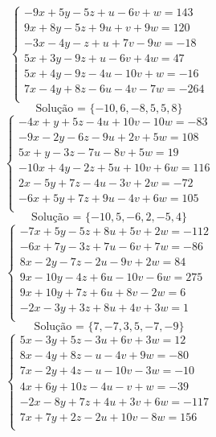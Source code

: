 \documentclass[12pt,oneside,a4paper]{article}
\begin{document}
\vspace{\baselineskip}
\begin{equation*}
\begin{cases}
-9x+5y-5z+u-6v+w=143 \\
9x+8y-5z+9u+v+9w=120 \\
-3x-4y-z+u+7v-9w=-18 \\
5x+3y-9z+u-6v+4w=47 \\
5x+4y-9z-4u-10v+w=-16 \\
7x-4y+8z-6u-4v-7w=-264 \\
\end{cases}
\end{equation*}
\begin{equation*}
\text{Solução = }\{-10,6,-8,5,5,8\}
\end{equation*}
\vspace{\baselineskip}
\begin{equation*}
\begin{cases}
-4x+y+5z-4u+10v-10w=-83 \\
-9x-2y-6z-9u+2v+5w=108 \\
5x+y-3z-7u-8v+5w=19 \\
-10x+4y-2z+5u+10v+6w=116 \\
2x-5y+7z-4u-3v+2w=-72 \\
-6x+5y+7z+9u-4v+6w=105 \\
\end{cases}
\end{equation*}
\begin{equation*}
\text{Solução = }\{-10,5,-6,2,-5,4\}
\end{equation*}
\vspace{\baselineskip}
\begin{equation*}
\begin{cases}
-7x+5y-5z+8u+5v+2w=-112 \\
-6x+7y-3z+7u-6v+7w=-86 \\
8x-2y-7z-2u-9v+2w=84 \\
9x-10y-4z+6u-10v-6w=275 \\
9x+10y+7z+6u+8v-2w=6 \\
-2x-3y+3z+8u+4v+3w=1 \\
\end{cases}
\end{equation*}
\begin{equation*}
\text{Solução = }\{7,-7,3,5,-7,-9\}
\end{equation*}
\vspace{\baselineskip}
\begin{equation*}
\begin{cases}
5x-3y+5z-3u+6v+3w=12 \\
8x-4y+8z-u-4v+9w=-80 \\
7x-2y+4z-u-10v-3w=-10 \\
4x+6y+10z-4u-v+w=-39 \\
-2x-8y+7z+4u+3v+6w=-117 \\
7x+7y+2z-2u+10v-8w=156 \\
\end{cases}
\end{equation*}
\end{document}

